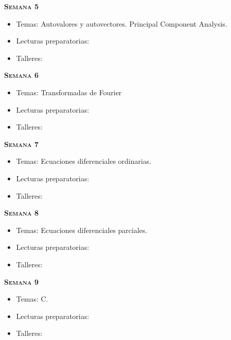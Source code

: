 \documentclass[letterpaper,10pt,onecolumn]{article}
\begin{document}
\noindent\textbf{\textsc{Semana 5}}\\[-0.5cm]
\begin{itemize}
\item Temas: Autovalores y autovectores. Principal Component
  Analysis. \\[-0.6cm]
\item Lecturas preparatorias: \\[-0.6cm]
\item Talleres: \\[-0.6cm]
\end{itemize}

\noindent\textbf{\textsc{Semana 6}}\\[-0.5cm]
\begin{itemize}
\item Temas: Transformadas de Fourier\\[-0.6cm]
\item Lecturas preparatorias: \\[-0.6cm]
\item Talleres: \\[-0.6cm]
\end{itemize}

\noindent\textbf{\textsc{Semana 7}}\\[-0.5cm]
\begin{itemize}
\item Temas: Ecuaciones diferenciales ordinarias. \\[-0.6cm]
\item Lecturas preparatorias: \\[-0.6cm]
\item Talleres: \\[-0.6cm]
\end{itemize}

\noindent\textbf{\textsc{Semana 8}}\\[-0.5cm]
\begin{itemize}
\item Temas: Ecuaciones diferenciales parciales. \\[-0.6cm]
\item Lecturas preparatorias: \\[-0.6cm]
\item Talleres: \\[-0.6cm]
\end{itemize}


\noindent\textbf{\textsc{Semana 9}}\\[-0.5cm]
\begin{itemize}
\item Temas: C. \\[-0.6cm]
\item Lecturas preparatorias: \\[-0.6cm]
\item Talleres: \\[-0.6cm]
\end{itemize}
\end{document}
